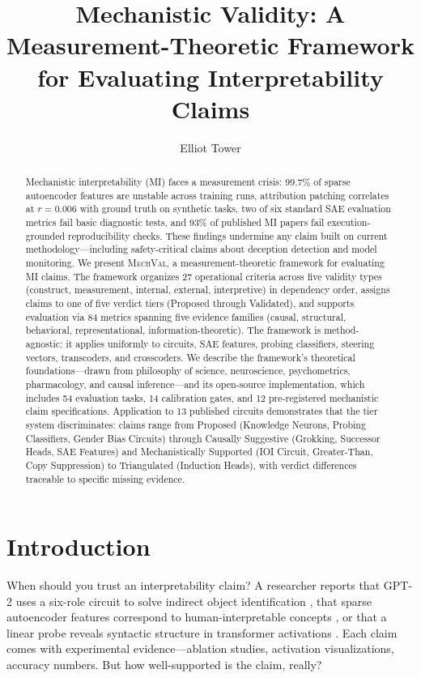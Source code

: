\documentclass[10pt]{article}
\title{Mechanistic Validity: A Measurement-Theoretic Framework for Evaluating Interpretability Claims}
\author[1]{Elliot Tower}
\affil[1]{Independent Researcher, \texttt{elliot@elliottower.ai}}
\date{}
\newcommand{\mechval}{\textsc{MechVal}}
\begin{document}
\maketitle

\begin{abstract}
Mechanistic interpretability (MI) faces a measurement crisis: 99.7\% of sparse autoencoder features are unstable across training runs, attribution patching correlates at $r = 0.006$ with ground truth on synthetic tasks, two of six standard SAE evaluation metrics fail basic diagnostic tests, and 93\% of published MI papers fail execution-grounded reproducibility checks. These findings undermine any claim built on current methodology---including safety-critical claims about deception detection and model monitoring. We present \mechval{}, a measurement-theoretic framework for evaluating MI claims. The framework organizes 27 operational criteria across five validity types (construct, measurement, internal, external, interpretive) in dependency order, assigns claims to one of five verdict tiers (Proposed through Validated), and supports evaluation via 84 metrics spanning five evidence families (causal, structural, behavioral, representational, information-theoretic). The framework is method-agnostic: it applies uniformly to circuits, SAE features, probing classifiers, steering vectors, transcoders, and crosscoders. We describe the framework's theoretical foundations---drawn from philosophy of science, neuroscience, psychometrics, pharmacology, and causal inference---and its open-source implementation, which includes 54 evaluation tasks, 14 calibration gates, and 12 pre-registered mechanistic claim specifications. Application to 13 published circuits demonstrates that the tier system discriminates: claims range from Proposed (Knowledge Neurons, Probing Classifiers, Gender Bias Circuits) through Causally Suggestive (Grokking, Successor Heads, SAE Features) and Mechanistically Supported (IOI Circuit, Greater-Than, Copy Suppression) to Triangulated (Induction Heads), with verdict differences traceable to specific missing evidence.
\end{abstract}

\section{Introduction}
\label{sec:intro}

When should you trust an interpretability claim? A researcher reports that GPT-2 uses a six-role circuit to solve indirect object identification \citep{wang2023interpretability}, that sparse autoencoder features correspond to human-interpretable concepts \citep{cunningham2023sparse}, or that a linear probe reveals syntactic structure in transformer activations \citep{belinkov2022probing}. Each claim comes with experimental evidence---ablation studies, activation visualizations, accuracy numbers. But how well-supported is the claim, really?
\end{document}
